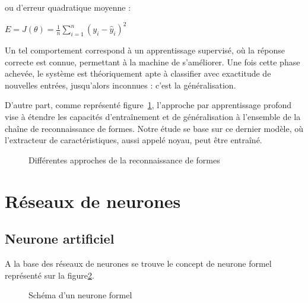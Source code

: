 \documentclass[a4paper,10pt]{report}
\begin{document}
ou d'erreur quadratique moyenne\cite{Bib_WikiMSE} :

\begin{center} $ E = J({\theta}) =  \frac{1}{n}\sum\limits_{i=1}^{n} (y_{i} - \hat{y}_{i})^2 $ \end{center}

Un tel comportement correspond à un apprentissage supervisé, où la réponse correcte est connue, permettant à la machine de s'améliorer. Une fois cette phase achevée, le système est théoriquement apte à
classifier avec exactitude de nouvelles entrées, jusqu'alors inconnues : c'est la généralisation.
\par
D'autre part, comme représenté figure~\ref{fig:c1p1s2}, l'approche par apprentissage profond vise à étendre les capacités d'entraînement et de généralisation à l'ensemble de la chaîne de reconnaissance de formes.
Notre étude se base sur ce dernier modèle, où l'extracteur de caractéristiques, aussi appelé noyau, peut être entraîné.

\begin{figure}[H]
    \centering
    \makebox[\textwidth]{}
    \caption{Différentes approches de la reconnaissance de formes}
    \label{fig:c1p1s2}
\end{figure}

\section{Réseaux de neurones}

\subsection{Neurone artificiel}

A la base des réseaux de neurones se trouve le concept de neurone formel représenté sur la figure\ref{fig:c1p2s1}.
\par
\begin{figure}[H]
    \centering
    \makebox[\textwidth]{}
    \caption{Schéma d'un neurone formel}
    \label{fig:c1p2s1}
\end{figure}
\end{document}
